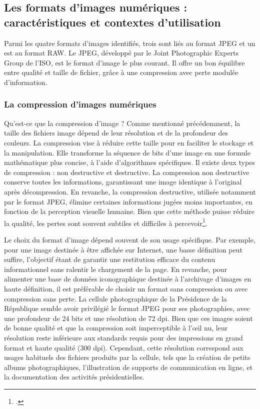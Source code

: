 \subsection*{Les formats d'images numériques : caractéristiques et contextes d'utilisation}

Parmi les quatre formats d'images identifiés, trois sont liés au format JPEG et un est au format RAW. Le JPEG, développé par le Joint Photographic Experts Group de l'ISO, est le format d'image le plus courant. Il offre un bon équilibre entre qualité et taille de fichier, grâce à une compression avec perte modulée d'information.

\subsubsection*{La compression d'images numériques}

Qu'est-ce que la compression d'image ? Comme mentionné précédemment, la taille des fichiers image dépend de leur résolution et de la profondeur des couleurs. La compression vise à réduire cette taille pour en faciliter le stockage et la manipulation. Elle transforme la séquence de bits d'une image en une formule mathématique plus concise, à l'aide d'algorithmes spécifiques. Il existe deux types de compression : non destructive et destructive. La compression non destructive conserve toutes les informations, garantissant une image identique à l'original après décompression. En revanche, la compression destructive, utilisée notamment par le format JPEG, élimine certaines informations jugées moins importantes, en fonction de la perception visuelle humaine. Bien que cette méthode puisse réduire la qualité, les pertes sont souvent subtiles et difficiles à percevoir\footcite{clirDidacticielImagerieNumerique2000}. 

Le choix du format d'image dépend souvent de son usage spécifique. Par exemple, pour une image destinée à être affichée sur Internet, une basse définition peut suffire, l'objectif étant de garantir une restitution efficace du contenu informationnel sans ralentir le chargement de la page. En revanche, pour alimenter une base de données iconographique destinée à l'archivage d'images en haute définition, il est préférable de choisir un format sans compression ou avec compression sans perte. La cellule photographique de la Présidence de la République semble avoir privilégié le format JPEG pour ses photographies, avec une profondeur de 24 bits et une résolution de 72 dpi. Bien que ces images soient de bonne qualité et que la compression soit imperceptible à l'œil nu, leur résolution reste inférieure aux standards requis pour des impressions en grand format et haute qualité (300 dpi). Cependant, cette résolution correspond aux usages habituels des fichiers produits par la cellule, tels que la création de petits albums photographiques, l'illustration de supports de communication en ligne, et la documentation des activités présidentielles.

